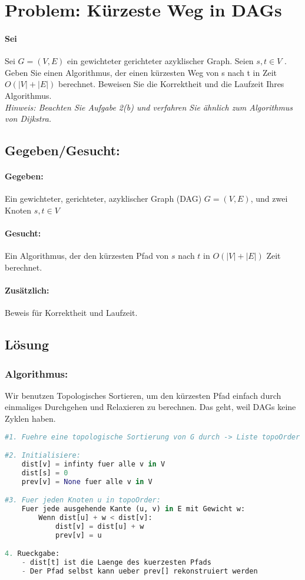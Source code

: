 \section{Problem: Kürzeste Weg in DAGs} 

\vspace{0.5em}
\noindent
\paragraph{Sei} Sei $G = (V, E)$ ein gewichteter gerichteter azyklischer Graph. Seien $s, t \in V$ . Geben Sie einen Algorithmus, der einen kürzesten Weg von s nach t in Zeit $O(|V | + |E|)$ berechnet. Beweisen Sie die Korrektheit und die Laufzeit Ihres Algorithmus.\\
\textit{Hinweis: Beachten Sie Aufgabe 2(b) und verfahren Sie ähnlich zum Algorithmus
von Dijkstra.}

\subsection{Gegeben/Gesucht:}

\paragraph{Gegeben:} Ein gewichteter, gerichteter, azyklischer Graph (DAG) $G=(V,E)$, und zwei Knoten $s,t \in V$
\paragraph{Gesucht:} Ein Algorithmus, der den kürzesten Pfad von $s$ nach $t$ in $O(|V| + |E|)$ Zeit berechnet.
\paragraph{Zusätzlich:} Beweis für Korrektheit und Laufzeit.

\subsection{Lösung}
\subsubsection{Algorithmus:}
Wir benutzen Topologisches Sortieren, um den kürzesten Pfad einfach durch einmaliges Durchgehen und Relaxieren zu berechnen. Das geht, weil DAGs keine Zyklen haben.\cite{guru99}

\begin{lstlisting}[language=Python]
#1. Fuehre eine topologische Sortierung von G durch -> Liste topoOrder

#2. Initialisiere:
	dist[v] = infinty fuer alle v in V
	dist[s] = 0
	prev[v] = None fuer alle v in V

#3. Fuer jeden Knoten u in topoOrder:
	Fuer jede ausgehende Kante (u, v) in E mit Gewicht w:
		Wenn dist[u] + w < dist[v]:
			dist[v] = dist[u] + w
			prev[v] = u

4. Rueckgabe:
	- dist[t] ist die Laenge des kuerzesten Pfads
	- Der Pfad selbst kann ueber prev[] rekonstruiert werden
\end{lstlisting}

